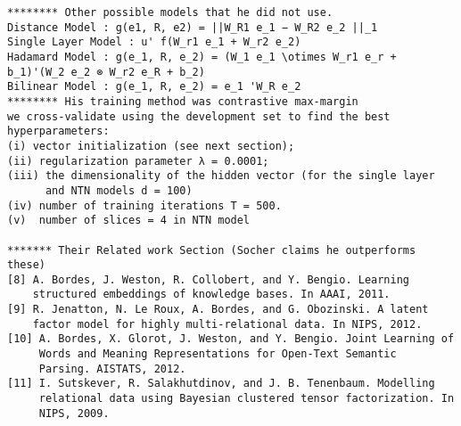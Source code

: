 \documentclass{article}
\begin{document}
\begin{verbatim}
******** Other possible models that he did not use.
Distance Model : g(e1, R, e2) = ||W_R1 e_1 − W_R2 e_2 ||_1
Single Layer Model : u' f(W_r1 e_1 + W_r2 e_2)
Hadamard Model : g(e_1, R, e_2) = (W_1 e_1 \otimes W_r1 e_r + b_1)'(W_2 e_2 ⊗ W_r2 e_R + b_2)
Bilinear Model : g(e_1, R, e_2) = e_1 'W_R e_2
******** His training method was contrastive max-margin
we cross-validate using the development set to find the best
hyperparameters:
(i) vector initialization (see next section);
(ii) regularization parameter λ = 0.0001;
(iii) the dimensionality of the hidden vector (for the single layer
      and NTN models d = 100)
(iv) number of training iterations T = 500.
(v)  number of slices = 4 in NTN model

******* Their Related work Section (Socher claims he outperforms these)
[8] A. Bordes, J. Weston, R. Collobert, and Y. Bengio. Learning
    structured embeddings of knowledge bases. In AAAI, 2011.
[9] R. Jenatton, N. Le Roux, A. Bordes, and G. Obozinski. A latent
    factor model for highly multi-relational data. In NIPS, 2012.
[10] A. Bordes, X. Glorot, J. Weston, and Y. Bengio. Joint Learning of
     Words and Meaning Representations for Open-Text Semantic
     Parsing. AISTATS, 2012.
[11] I. Sutskever, R. Salakhutdinov, and J. B. Tenenbaum. Modelling
     relational data using Bayesian clustered tensor factorization. In
     NIPS, 2009.
\end{verbatim}
% 
% 
\end{document}
